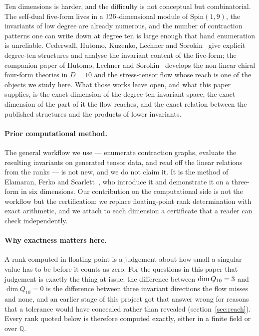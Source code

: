 \documentclass[11pt,a4paper]{article}
\theoremstyle{definition}
\theoremstyle{remark}
\newcommand{\Qten}{Q_{10}}
\newcommand{\Q}{\mathbb{Q}}
\begin{document}
Ten dimensions is harder, and the difficulty is not conceptual but
combinatorial. The self-dual five-form lives in a $126$-dimensional
module of $\mathrm{Spin}(1,9)$, the invariants of low degree are already
numerous, and the number of contraction patterns one can write down at degree ten
is large enough that hand enumeration is unreliable. Cederwall, Hutomo, Kuzenko,
Lechner and Sorokin~\cite{Cederwall:2025invariants} give explicit degree-ten
structures and analyse the invariant content of the five-form; the companion
paper of Hutomo, Lechner and Sorokin~\cite{Hutomo:2025chiral} develops the
non-linear chiral four-form theories in $D=10$ and the stress-tensor flow whose
reach is one of the objects we study here. What those works leave open, and what
this paper supplies, is the exact dimension of the degree-ten invariant space,
the exact dimension of the part of it the flow reaches, and the exact relation
between the published structures and the products of lower invariants.

\paragraph{Prior computational method.}
The general workflow we use --- enumerate contraction graphs, evaluate the
resulting invariants on generated tensor data, and read off the linear relations
from the ranks --- is not new, and we do not claim it. It is the method of
Elamaran, Ferko and Scarlett~\cite{Elamaran:2025mlinv}, who introduce it and
demonstrate it on a three-form in six dimensions. Our contribution on the
computational side is not the workflow but the certification: we replace
floating-point rank determination with exact arithmetic, and we attach to each
dimension a certificate that a reader can check independently.

\paragraph{Why exactness matters here.}
A rank computed in floating point is a judgement about how small a singular
value has to be before it counts as zero. For the questions in this paper that
judgement is exactly the thing at issue: the difference between
$\dim \Qten = \dimQtenQ$ and $\dim \Qten = 0$ is the difference between three
invariant directions the flow misses and none, and an earlier stage of this
project got that answer wrong for reasons that a tolerance would have concealed
rather than revealed (section~\ref{sec:reach}). Every rank quoted below is
therefore computed exactly, either in a finite field or over $\Q$.
\end{document}
